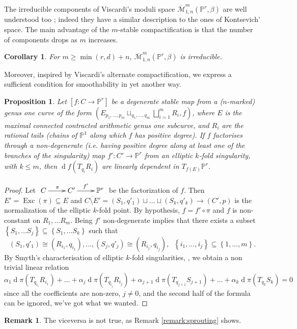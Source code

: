 \documentclass[11pt]{amsart}
\newcommand{\PP}{\mathbb P}
\renewcommand{\to}{\rightarrow}
\theoremstyle{plain}
\newtheorem{prop}[thm]{Proposition}
\newtheorem{cor}[thm]{Corollary}
\theoremstyle{definition}
\newtheorem*{rem}{Remark}
\begin{document}
The irreducible components of Viscardi's moduli space $\overline{\mathcal{M}}^m_{1,n}(\PP^r,\beta)$ are well understood too \cite[Thm.~5.9]{VISC}; indeed they have a similar description to the ones of Kontsevich' space. The main advantage of the $m$-stable compactification is that the number of components drops as $m$ increases.
 \begin{cor}\cite[Cor.~5.10]{VISC}
 For $m\geq\operatorname{min}(r,d)+n$, $\overline{\mathcal{M}}^m_{1,n}(\PP^r,\beta)$ is irreducible.
 \end{cor}


 Moreover, inspired by Viscardi's alternate compactification, we express a sufficient condition for smoothability in yet another way.
 \begin{prop}
Let $[f\colon C\to \PP^r]$ be a degenerate stable map from a ($n$-marked) genus one curve of the form $(E {}_{p_1,\ldots,p_m}\sqcup_{q_1,\ldots,q_m}\bigsqcup_{i=1}^m R_i,f)$, where $E$ is the maximal connected contracted arithmetic genus one subcurve, and $R_i$ are the rational tails (chains of $\PP^1$ along which $f$ has positive degree). 
 If $f$ factorises through a \emph{non-degenerate} (i.e. having positive degree along at least one of the branches of the singularity) map $f'\colon C'\to\PP^r$ from an elliptic $k$-fold singularity, with $k\leq m$, then  $\operatorname{d}\!f(T_{q_i}R_i)$ are linearly dependent in $T_{f(E)}\PP^r$.
 \end{prop}
 \begin{proof}
 Let $\xymatrix{C\ar[r]^{\pi} &C'\ar[r]^{f'} &\PP^r}$ be the factorization of $f$. Then $E'=\operatorname{Exc}(\pi)\subseteq E$ and 
  $\overline{C\setminus E'}=(S_1,q'_1)\sqcup\dots\sqcup (S_k,q'_k)\to (C',p)$ 
  is the normalization of the elliptic $k$-fold point. By hypothesis, $f=f'\circ\pi$ and $f$ is non-constant on $R_1,\dots R_m.$ Being $f'$ non-degenerate implies that there exists a subset
  $\left\{S_1,\ldots S_j\right\}\subseteq\left\{S_1,\ldots S_k\right\}$ 
  such that \[(S_1,q'_1)\cong (R_{i_1}, q_{i_1}),\ldots, (S_j,q'_j)\cong (R_{i_j}, q_{i_j}),\;\;\left\{i_1,\dots,i_j\right\}\subseteq \left\{1,\dots,m\right\}.\] 
By Smyth's characterisation of elliptic $k$-fold singularities, \cite[Lem.~2.2]{SMY1}, we obtain a non trivial linear relation 
  \begin{equation*}
  \label{eq:dep}\alpha_1\operatorname{d}\!\pi(T_{q_{i_1}}R_{i_1})+\ldots+\alpha_j \operatorname{d}\!\pi(T_{q_{i_j}}R_{i_j})+\alpha_{j+1}\operatorname{d}\!\pi(T_{q_{j+1}}S_{j+1})+\ldots+\alpha_k \operatorname{d}\!\pi(T_{q_k}S_k)=0
  \end{equation*}
  since all the coefficients are non-zero, $j\neq0$, and the second half of the formula can be ignored, we've got what we wanted.
  \end{proof}
\begin{rem}\label{remark:cuspunionline} 
The viceversa is not true, as Remark \ref{remark:sprouting} shows.
\end{rem}
\end{document}
